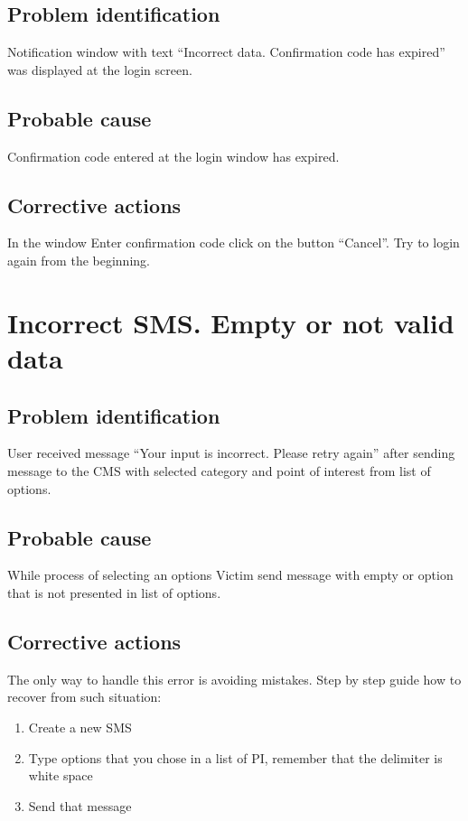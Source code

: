 \subsection{Problem identification}
Notification window with text ``Incorrect data. Confirmation code has
expired'' was displayed at the login screen.

\subsection{Probable cause}
Confirmation code entered at the login window has expired.

\subsection{Corrective actions}
In the window Enter confirmation code click on the button ``Cancel''. 
Try to login again from the beginning.

\section{Incorrect SMS. Empty or not valid data}

\subsection{Problem identification}
User received message ``Your input is incorrect. Please
retry again'' after sending message to the CMS with
selected category and point of interest from list of options. 

\subsection{Probable cause}
While process of selecting an options Victim send message with empty or option
that is not presented in list of options.

\subsection{Corrective actions}
The only way to handle this error is avoiding mistakes. Step by step guide how to recover from such situation:
\begin{enumerate}
  \item Create a new SMS
  \item Type options that you chose in a list of PI, remember that the delimiter
  is white space
  \item Send that message
\end{enumerate}

